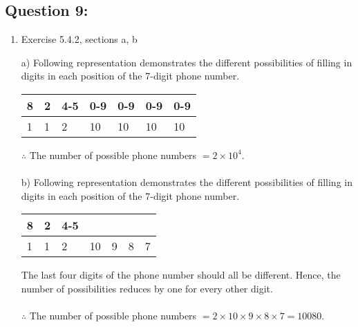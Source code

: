 \documentclass[14pt]{extreport}
\begin{document}
\subsection*{Question 9:}
\begin{enumerate}[label=(\alph*)]

\item  Exercise	5.4.2,	sections	a,	b
\newline

a) Following representation demonstrates the different possibilities of filling in digits in each position of the 7-digit phone number.

\begin{table}[h]
\centering
\begin{tabular}{lllllll}
\hline
\multicolumn{1}{|l|}{8} & \multicolumn{1}{l|}{2} & \multicolumn{1}{l|}{4-5} & \multicolumn{1}{l|}{0-9} & \multicolumn{1}{l|}{0-9} & \multicolumn{1}{l|}{0-9} & \multicolumn{1}{l|}{0-9} \\ \hline
1                       & 1                      & 2                        & 10                       & 10                       & 10                       & 10                      
\end{tabular}
\end{table}

$\therefore$ The number of possible phone numbers $= 2 \times 10^4.$ \\\\

b) Following representation demonstrates the different possibilities of filling in digits in each position of the 7-digit phone number.

\begin{table}[h]
\centering
\begin{tabular}{lllllll}
\hline
\multicolumn{1}{|l|}{8} & \multicolumn{1}{l|}{2} & \multicolumn{1}{l|}{4-5} & \multicolumn{1}{l|}{} & \multicolumn{1}{l|}{} & \multicolumn{1}{l|}{} & \multicolumn{1}{l|}{} \\ \hline
1                       & 1                      & 2                        & 10                    & 9                     & 8                     & 7                    
\end{tabular}
\end{table}
The last four digits of the phone number should all be different. Hence, the number of possibilities reduces by one for every other digit. \\\\
$\therefore$ The number of possible phone numbers $= 2 \times 10 \times 9 \times 8 \times 7 = 10080. $


\end{enumerate}
\end{document}
